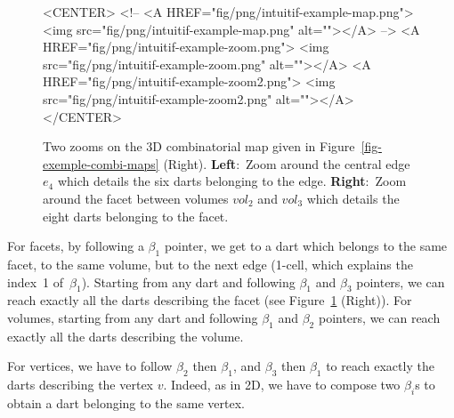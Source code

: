 \begin{figure}
\begin{ccTexOnly}
\begin{center}
    \end{center}
  \end{ccTexOnly}
  \begin{ccHtmlOnly}
    <CENTER>
    <!-- <A HREF="fig/png/intuitif-example-map.png">
    <img src="fig/png/intuitif-example-map.png" alt=""></A> -->
    <A HREF="fig/png/intuitif-example-zoom.png">
        <img src="fig/png/intuitif-example-zoom.png" alt=""></A>
    <A HREF="fig/png/intuitif-example-zoom2.png">
        <img src="fig/png/intuitif-example-zoom2.png" alt=""></A>
    </CENTER>
    \end{ccHtmlOnly}
    \caption{Two zooms on the 3D combinatorial map given in 
      Figure~\ref{fig-exemple-combi-maps} (Right).
      \textbf{Left}:~Zoom around the central edge $e_4$ which details
      the six darts belonging to the edge.  \textbf{Right}:~Zoom
      around the facet between volumes $vol_2$ and $vol_3$ which
      details the eight darts belonging to the facet.}
    \label{fig-intuitive-exemple}
\end{figure}

For facets, by following a $\beta_1$ pointer, we get to a dart which
belongs to the same facet, to the same volume, but to the next edge
(1-cell, which explains the index~1 of~$\beta_1$).  Starting from any
dart and following $\beta_1$ and $\beta_3$ pointers, we can reach
exactly all the darts describing the facet (see
Figure~\ref{fig-intuitive-exemple} (Right)).
%
For volumes, starting from any dart and following $\beta_1$ and
$\beta_2$ pointers, we can reach exactly all the darts describing the
volume.

For vertices, we have to follow $\beta_2$ then $\beta_1$, and
$\beta_3$ then $\beta_1$ to reach exactly the darts describing the
vertex $v$. Indeed, as in 2D, we have to compose two $\beta_i$s to
obtain a dart belonging to the same vertex.

